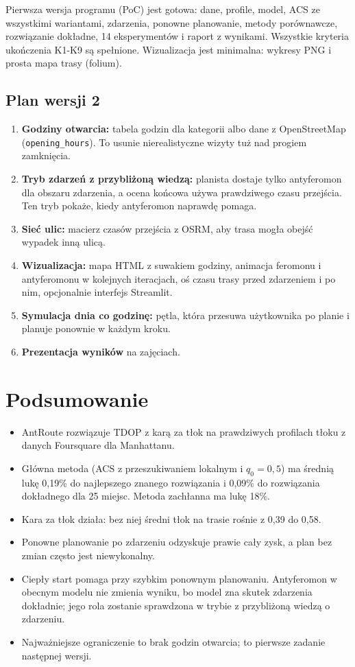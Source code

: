 \documentclass[11pt,a4paper]{article}
\begin{document}
Pierwsza wersja programu (PoC) jest gotowa: dane, profile, model, ACS ze wszystkimi wariantami, zdarzenia, ponowne planowanie, metody porównawcze, rozwiązanie dokładne, 14 eksperymentów i raport z wynikami. Wszystkie kryteria ukończenia K1-K9 są spełnione. Wizualizacja jest minimalna: wykresy PNG i prosta mapa trasy (folium).

\subsection{Plan wersji 2}

\begin{enumerate}
  \item \textbf{Godziny otwarcia:} tabela godzin dla kategorii albo dane z OpenStreetMap (\texttt{opening\_hours}). To usunie nierealistyczne wizyty tuż nad progiem zamknięcia.
  \item \textbf{Tryb zdarzeń z przybliżoną wiedzą:} planista dostaje tylko antyferomon dla obszaru zdarzenia, a ocena końcowa używa prawdziwego czasu przejścia. Ten tryb pokaże, kiedy antyferomon naprawdę pomaga.
  \item \textbf{Sieć ulic:} macierz czasów przejścia z OSRM, aby trasa mogła obejść wypadek inną ulicą.
  \item \textbf{Wizualizacja:} mapa HTML z suwakiem godziny, animacja feromonu i antyferomonu w kolejnych iteracjach, oś czasu trasy przed zdarzeniem i po nim, opcjonalnie interfejs Streamlit.
  \item \textbf{Symulacja dnia co godzinę:} pętla, która przesuwa użytkownika po planie i planuje ponownie w każdym kroku.
  \item \textbf{Prezentacja wyników} na zajęciach.
\end{enumerate}

\section{Podsumowanie}

\begin{itemize}
  \item AntRoute rozwiązuje TDOP z karą za tłok na prawdziwych profilach tłoku z danych Foursquare dla Manhattanu.
  \item Główna metoda (ACS z przeszukiwaniem lokalnym i $q_0 = 0{,}5$) ma średnią lukę 0,19\% do najlepszego znanego rozwiązania i 0,09\% do rozwiązania dokładnego dla 25 miejsc. Metoda zachłanna ma lukę 18\%.
  \item Kara za tłok działa: bez niej średni tłok na trasie rośnie z 0,39 do 0,58.
  \item Ponowne planowanie po zdarzeniu odzyskuje prawie cały zysk, a plan bez zmian często jest niewykonalny.
  \item Ciepły start pomaga przy szybkim ponownym planowaniu. Antyferomon w obecnym modelu nie zmienia wyniku, bo model zna skutek zdarzenia dokładnie; jego rola zostanie sprawdzona w trybie z przybliżoną wiedzą o zdarzeniu.
  \item Najważniejsze ograniczenie to brak godzin otwarcia; to pierwsze zadanie następnej wersji.
\end{itemize}
\end{document}
